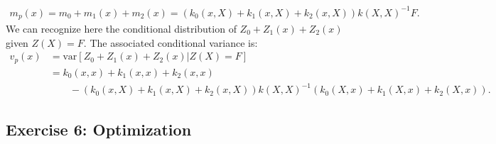 \documentclass[a4paper,10pt]{article}
\newcommand{\var}{\mbox{var}}
\begin{document}
\begin{enumerate}[label=Q\arabic*.]
\begin{align*}
	m_p(x) = m_0 + m_1(x) + m_2(x) = (k_0(x,X) + k_1(x,X) + k_2(x,X)) k(X,X)^{-1}F.
\end{align*}
We can recognize here the conditional distribution of $Z_0 + Z_1(x) + Z_2(x)$ given $Z(X)=F$. The associated conditional variance is:
\begin{align*}
	v_p(x) &= \var [ Z_0 + Z_1(x) + Z_2(x) | Z(X)=F] \\
	&= k_0(x,x) + k_1(x,x) + k_2(x,x) \\
	& \qquad - (k_0(x,X) + k_1(x,X) + k_2(x,X)) k(X,X)^{-1} (k_0(X,x) + k_1(X,x) + k_2(X,x)).
\end{align*}
\end{enumerate}

\subsection*{Exercise 6: Optimization}
\end{document}
